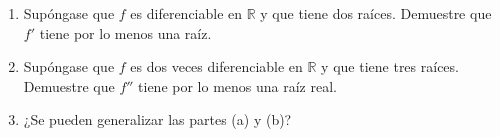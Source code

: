 \item 
\begin{enumerate}
        \item[(a)] Supóngase que $f$ es diferenciable en $\mathbb{R}$ y que tiene dos raíces. Demuestre que $f'$ tiene por lo menos una raíz.
        \item[(b)] Supóngase que $f$ es dos veces diferenciable en $\mathbb{R}$ y que tiene tres raíces. Demuestre que $f''$ tiene por lo menos una raíz real.
        \item[(c)] ¿Se pueden generalizar las partes (a) y (b)?
    \end{enumerate}
